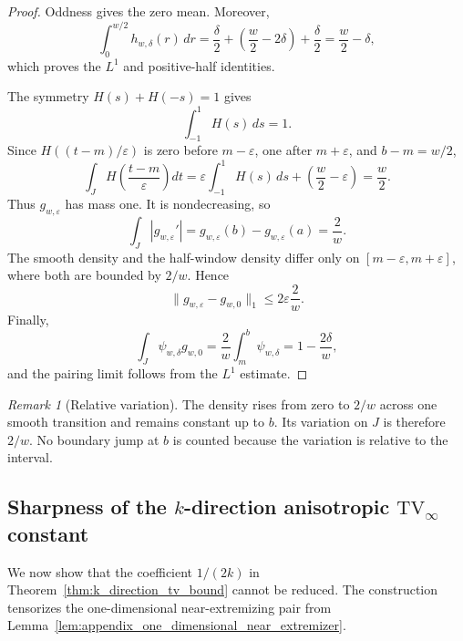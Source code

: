 \documentclass[11pt,letterpaper]{article}
\theoremstyle{definition}
\theoremstyle{remark}
\newtheorem{remark}[theorem]{Remark}
\newcommand{\TV}{\mathrm{TV}}
\begin{document}
\begin{proof}
Oddness gives the zero mean. Moreover,
$$
\int_0^{w/2}h_{w,\delta}(r)\,dr
=
\frac{\delta}{2}
+
\left(\frac w2-2\delta\right)
+
\frac{\delta}{2}
=
\frac w2-\delta,
$$
which proves the $L^1$ and positive-half identities.

The symmetry $H(s)+H(-s)=1$ gives
$$
\int_{-1}^1H(s)\,ds=1.
$$
Since $H((t-m)/\varepsilon)$ is zero before $m-\varepsilon$, one after
$m+\varepsilon$, and $b-m=w/2$,
$$
\int_JH\left(\frac{t-m}{\varepsilon}\right)dt
=
\varepsilon\int_{-1}^1H(s)\,ds
+
\left(\frac w2-\varepsilon\right)
=
\frac w2.
$$
Thus $g_{w,\varepsilon}$ has mass one. It is nondecreasing, so
$$
\int_J|g_{w,\varepsilon}'|
=
g_{w,\varepsilon}(b)-g_{w,\varepsilon}(a)
=
\frac2w.
$$
The smooth density and the half-window density differ only on
$[m-\varepsilon,m+\varepsilon]$, where both are bounded by $2/w$. Hence
$$
\|g_{w,\varepsilon}-g_{w,0}\|_1
\le
2\varepsilon\frac2w.
$$
Finally,
$$
\int_J\psi_{w,\delta}g_{w,0}
=
\frac2w\int_m^b\psi_{w,\delta}
=
1-\frac{2\delta}{w},
$$
and the pairing limit follows from the $L^1$ estimate.
\end{proof}

\begin{remark}[Relative variation]
\label{rem:appendix_smooth_extremizer_internal_variation}
The density rises from zero to $2/w$ across one smooth transition and remains
constant up to $b$. Its variation on $J$ is therefore $2/w$. No boundary jump
at $b$ is counted because the variation is relative to the interval.
\end{remark}



\subsection{Sharpness of the
\texorpdfstring{$k$}{k}-direction anisotropic
\texorpdfstring{$\TV_\infty$}{TV-infinity} constant}
\label{subsec:appendix_k_direction_tv_sharpness}

We now show that the coefficient $1/(2k)$ in
Theorem~\ref{thm:k_direction_tv_bound} cannot be reduced. The construction
tensorizes the one-dimensional near-extremizing pair from
Lemma~\ref{lem:appendix_one_dimensional_near_extremizer}.
\end{document}
